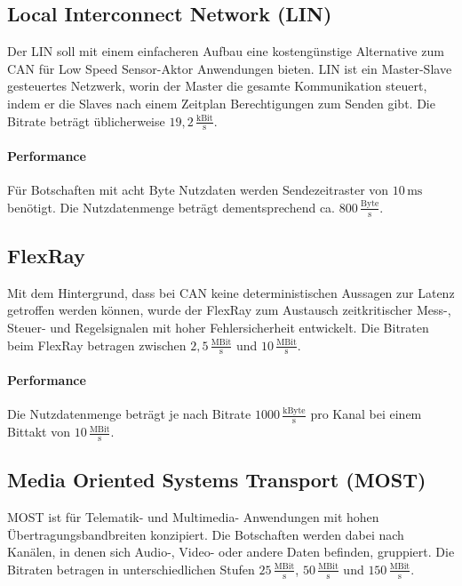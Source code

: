 \subsection{Local Interconnect Network (LIN)} 
Der LIN soll mit einem einfacheren Aufbau eine kostengünstige Alternative zum CAN für Low Speed Sensor-Aktor Anwendungen bieten. \cite[Vgl. Seite 138 ff.]{Borgeest.2021}
LIN ist ein Master-Slave gesteuertes Netzwerk, worin der Master die gesamte Kommunikation steuert, indem er die Slaves nach einem Zeitplan Berechtigungen zum Senden gibt. Die Bitrate beträgt üblicherweise $ 19,2\,\frac{\mathrm{kBit}}{\mathrm{s}} $. \cite[Vgl. Seite 79 ff.]{Zimmermann.2014}
\paragraph{Performance}
Für Botschaften mit acht Byte Nutzdaten werden Sendezeitraster von $ 10\,\mathrm{ms} $ benötigt. Die Nutzdatenmenge beträgt dementsprechend ca. $ 800\,\frac{\mathrm{Byte}}{\mathrm{s}} $. \cite[Vgl. Seite 94 f.]{Zimmermann.2014}
\subsection{FlexRay}
Mit dem Hintergrund, dass bei CAN keine deterministischen Aussagen zur Latenz getroffen werden können, wurde der FlexRay zum Austausch zeitkritischer Mess-, Steuer- und Regelsignalen mit hoher Fehlersicherheit entwickelt. Die Bitraten beim FlexRay betragen zwischen $ 2,5\,\frac{\mathrm{MBit}}{\mathrm{s}} $ und $ 10\,\frac{\mathrm{MBit}}{\mathrm{s}} $.
\cite[Vgl. Seite 96 ff.]{Zimmermann.2014}
\paragraph{Performance}
Die Nutzdatenmenge beträgt je nach Bitrate $ 1000\,\frac{\mathrm{kByte}}{\mathrm{s}} $ pro Kanal bei einem Bittakt von $ 10\,\frac{\mathrm{MBit}}{\mathrm{s}} $. \cite[Vgl. Seite 118 f.]{Zimmermann.2014}
\subsection{Media Oriented Systems Transport (MOST)}
MOST ist für Telematik- und Multimedia- Anwendungen mit hohen Übertragungsbandbreiten konzipiert.
Die Botschaften werden dabei nach Kanälen, in denen sich Audio-, Video- oder andere Daten befinden, gruppiert.
Die Bitraten betragen in unterschiedlichen Stufen $ 25\,\frac{\mathrm{MBit}}{\mathrm{s}} $, $ 50\,\frac{\mathrm{MBit}}{\mathrm{s}} $ und $ 150\,\frac{\mathrm{MBit}}{\mathrm{s}} $.
